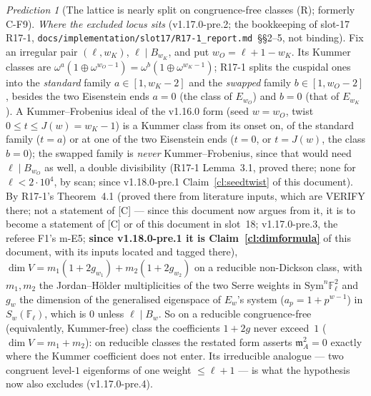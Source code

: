 \documentclass[11pt]{article}
\theoremstyle{remark}
\newtheorem{prediction}[theorem]{Prediction}
\newcommand{\F}{\mathbb{F}}
\newcommand{\Sym}{\mathrm{Sym}}
\newcommand{\Fl}{\F_\ell}
\newcommand{\m}{\mathfrak{m}}
\begin{document}
\begin{prediction}[The lattice is nearly split on congruence-free classes (R); formerly C-F9]
\emph{Where the excluded locus sits} (v1.17.0-pre.2; the bookkeeping of slot-17 R17-1, \texttt{docs/implementation/slot17/R17-1\_report.md}~\S\S2--5, not
binding). Fix an irregular pair $(\ell,w_K)$, $\ell\mid B_{w_K}$, and put $w_O=\ell+1-w_K$. Its Kummer classes are $\omega^a(1\oplus\omega^{w_O-1})=
\omega^b(1\oplus\omega^{w_K-1})$; R17-1 splits the cuspidal ones into the \emph{standard} family $a\in[1,w_K-2]$ and the \emph{swapped} family
$b\in[1,w_O-2]$, besides the two Eisenstein ends $a=0$ (the class of $E_{w_O}$) and $b=0$ (that of $E_{w_K}$). A Kummer--Frobenius ideal of the v1.16.0 form
(seed $w=w_O$, twist $0\le t\le J(w)=w_K-1$) is a Kummer class from its onset on, of the standard family ($t=a$) or at one of the two Eisenstein ends
($t=0$, or $t=J(w)$, the class $b=0$); the swapped family is \emph{never} Kummer--Frobenius, since that would need $\ell\mid B_{w_O}$ as
well, a double divisibility (R17-1 Lemma~3.1, proved there; none for $\ell<2\cdot10^4$, by scan; since v1.18.0-pre.1 Claim~\ref{cl:seedtwist} of this document). By R17-1's Theorem~4.1 (proved there from literature inputs, which are VERIFY there;
not a statement of [C] --- since this document now argues from it, it is to become a statement of [C] or of this document in slot~18; v1.17.0-pre.3, the
referee F1's m-E5; \textbf{since v1.18.0-pre.1 it is Claim~\ref{cl:dimformula}} of this document, with its inputs located and tagged there), $\dim V=m_1(1+2g_{w_1})+m_2(1+2g_{w_2})$ on a reducible non-Dickson class, with $m_1,m_2$ the Jordan--H\"older multiplicities of the
two Serre weights in $\Sym^n\Fl^2$ and $g_w$ the dimension of the generalised eigenspace of $E_w$'s system ($a_p=1+p^{w-1}$) in $S_w(\Fl)$, which is $0$ unless $\ell\mid B_w$. So on a reducible
congruence-free (equivalently, Kummer-free) class the coefficients $1+2g$ never exceed~$1$ ($\dim V=m_1+m_2$): on reducible classes the restated form asserts
$\m_A^2=0$ exactly where the Kummer coefficient does not enter. Its irreducible analogue --- two congruent level-$1$ eigenforms of one weight $\le\ell+1$ ---
is what the hypothesis now also excludes (v1.17.0-pre.4).


\end{prediction}
\end{document}
